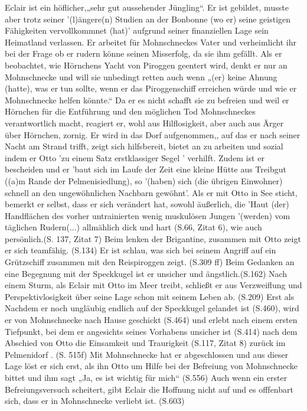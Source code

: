 {Eclair ist ein höflicher,\cite[S.16]{pir}\cite[S.42ff]{pir}„sehr gut aussehender Jüngling“.\cite[S.15]{pir} Er ist gebildet, \cite[S.15]{pir} musste aber trotz seiner '(l)ängere(n) Studien an der Bonbonne (wo er) seine geistigen Fähigkeiten vervollkommnet (hat)'\cite[S.15]{pir} aufgrund seiner finanziellen Lage sein Heimatland verlassen.\cite[S.15f]{pir} Er arbeitet für Mohnschneckes Vater und verheimlicht ihr bei der Frage ob er rudern könne \cite[S.17]{pir} seinen Misserfolg, da sie ihm gefällt.\cite[S.17]{pir} Als er beobachtet, wie Hörnchens Yacht von Piroggen geentert wird, denkt er nur an Mohnschnecke und will sie unbedingt retten\cite[S.29]{pir} auch wenn „(er) keine Ahnung (hatte), was er tun sollte, wenn er das Piroggenschiff erreichen würde und wie er Mohnschnecke helfen könnte.“ Da er es nicht schafft sie zu befreien und weil er Hörnchen für die Entführung und den möglichen Tod Mohnschneckes verantwortlich macht, reagiert er, wohl aus Hilflosigkeit, aber auch aus Ärger über Hörnchen, zornig.\cite[S.36]{pir} Er wird in das Dorf aufgenommen,\cite[S.67]{pir}, auf das er nach seiner Nacht am Strand trifft, \cite[S.43]{pir} zeigt sich hilfsbereit,\cite[S.44]{pir} bietet an zu arbeiten\cite[S.44]{pir} und sozial indem er Otto 'zu einem Satz erstklassiger Segel '\cite[S.106ff]{pir} verhilft. Zudem ist er bescheiden und er 'baut sich im Laufe der Zeit eine kleine Hütte aus Treibgut ((a)m Rande der Pelmenisiedlung),\cite[S.67]{pir} so '(haben) sich (die übrigen Einwohner) schnell an den ungewöhnlichen Nachbarn gewöhnt'.\cite[S.67]{pir} Als er mit Otto in See sticht, bemerkt er selbst, dass er sich verändert hat, sowohl äußerlich, die 'Haut (der) Handflächen\cite[S.66]{pir} des vorher untrainierten wenig muskulösen Jungen \cite[S.15]{pir} '(werden) vom täglichen Rudern(...) allmählich dick und hart\cite[S.66]{pir}  (S.66, Zitat 6), wie auch persönlich.(S. 137, Zitat 7) Beim lenken der Brigantine, zusammen mit Otto zeigt er sich teamfähig. (S.134) Er ist schlau, was sich bei seinem Angriff auf ein Grützschiff zusammen mit den Reispiroggen zeigt. (S.309 ff) Beim Gedanken an eine Begegnung mit der Speckkugel ist er  unsicher und ängstlich.(S.162) Nach einem Sturm, als Eclair mit Otto im Meer treibt, schließt er aus Verzweiflung und Perspektivlosigkeit über seine Lage schon mit seinem Leben ab. (S.209) Erst als Nachdem er noch ungläubig endlich auf der Speckkugel gelandet ist (S.460), wird er von Mohnschnecke nach Hause geschickt (S.464) und erlebt  nach einem ersten Tiefpunkt, bei dem er angesichts seines Vorhabens unsicher ist (S.414) nach dem Abschied von Otto die Einsamkeit und Traurigkeit (S.117, Zitat 8) zurück im Pelmenidorf . (S. 515f) Mit Mohnschnecke hat er abgeschlossen und aus dieser Lage löst er sich erst, als ihn Otto um Hilfe bei der Befreiung von Mohnschnecke bittet und ihm sagt „Ja, es ist wichtig für mich“ (S.556) Auch wenn ein erster Befreiungsversuch scheitert, gibt Eclair die Hoffnung nicht auf und es offfenbart sich, dass er in Mohnschnecke verliebt ist. (S.603)

}
